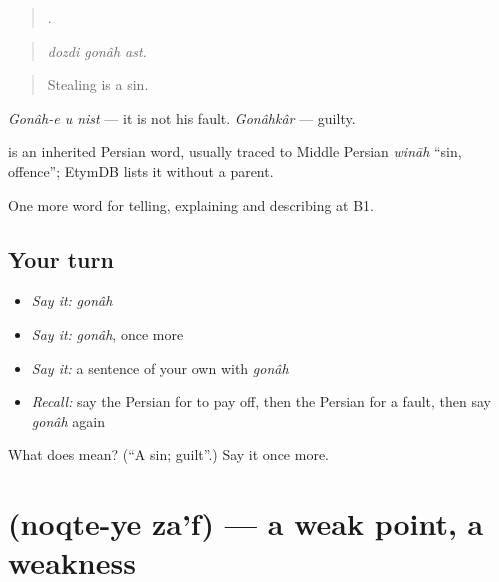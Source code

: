 \begin{quote}
  .
\end{quote}

\begin{quote}
\emph{dozdi gonâh ast.}
\end{quote}

\begin{quote}
Stealing is a sin.
\end{quote}

\emph{Gonâh-e u nist} — it is not his fault. \emph{Gonâhkâr} — guilty.

\begin{cousinweb}
\textbf{} is an inherited Persian word, usually traced to Middle Persian \emph{wināh} \textquotedblleft{}sin, offence\textquotedblright{}; EtymDB lists it without a parent.
\end{cousinweb}

\begin{grammarlens}[title={What you've built}]
One more word for telling, explaining and describing at B1.
\end{grammarlens}

\subsection*{Your turn}
\begin{itemize}
\raggedright
  \item \emph{Say it:} \emph{gonâh}
  \item \emph{Say it:} \emph{gonâh}, once more
  \item \emph{Say it:} a sentence of your own with \emph{gonâh}
  \item \emph{Recall:} say the Persian for to pay off, then the Persian for a fault, then say \emph{gonâh} again
\end{itemize}

\begin{tcolorbox}[breakable,colback=teal!4,colframe=teal!35!black,title={Before you move on}]
What does  mean? (\textquotedblleft{}A sin; guilt\textquotedblright{}.) Say it once more.
\end{tcolorbox}
\section[\texorpdfstring{\fa{نقطه} \fa{ضعف} (noqte-ye za'f)}{نقطه ضعف (noqte-ye za'f)}]{  (noqte-ye za'f) — a weak point, a weakness}

